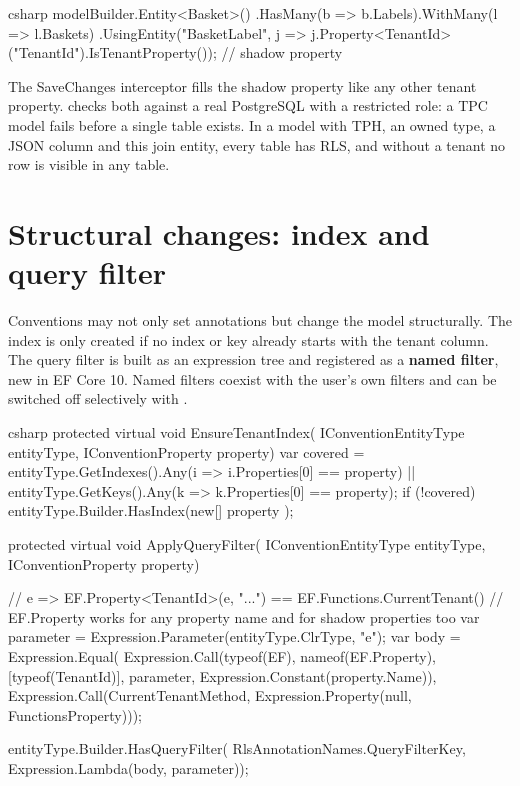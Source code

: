 \begin{sourcecode}[Application]{csharp}
modelBuilder.Entity<Basket>()
    .HasMany(b => b.Labels).WithMany(l => l.Baskets)
    .UsingEntity("BasketLabel",
        j => j.Property<TenantId>("TenantId").IsTenantProperty());   // shadow property
\end{sourcecode}

The SaveChanges interceptor fills the shadow property like any other tenant property.
 checks both against a real PostgreSQL
with a restricted role: a TPC model fails before a single table exists. In a model with TPH, an
owned type, a JSON column and this join entity, every table has RLS, and without a tenant no row
is visible in any table.

\section{Structural changes: index and query filter}

Conventions may not only set annotations but change the model structurally. The index is
only created if no index or key already starts with the tenant column. The query filter is
built as an expression tree and registered as a \textbf{named filter}, new in EF Core 10.
Named filters coexist with the user's own filters and can be switched off selectively with
.

\begin{sourcecode}{csharp}
protected virtual void EnsureTenantIndex(
    IConventionEntityType entityType, IConventionProperty property)
{
    var covered = entityType.GetIndexes().Any(i => i.Properties[0] == property)
                  || entityType.GetKeys().Any(k => k.Properties[0] == property);
    if (!covered)
        entityType.Builder.HasIndex(new[] { property });
}

protected virtual void ApplyQueryFilter(
    IConventionEntityType entityType, IConventionProperty property)
{
    // e => EF.Property<TenantId>(e, "...") == EF.Functions.CurrentTenant()
    // EF.Property works for any property name and for shadow properties too
    var parameter = Expression.Parameter(entityType.ClrType, "e");
    var body = Expression.Equal(
        Expression.Call(typeof(EF), nameof(EF.Property), [typeof(TenantId)],
            parameter, Expression.Constant(property.Name)),
        Expression.Call(CurrentTenantMethod, Expression.Property(null, FunctionsProperty)));

    entityType.Builder.HasQueryFilter(
        RlsAnnotationNames.QueryFilterKey, Expression.Lambda(body, parameter));
}
\end{sourcecode}

